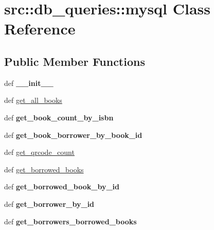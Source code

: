 \hypertarget{classsrc_1_1db__queries_1_1mysql}{
\section{src::db\_\-queries::mysql Class Reference}
\label{classsrc_1_1db__queries_1_1mysql}
}
\subsection*{Public Member Functions}
\begin{DoxyCompactItemize}
\item 
\hypertarget{classsrc_1_1db__queries_1_1mysql_a4583def66e219f8d596357267aec5e39}{
def {\bfseries \_\-\_\-init\_\-\_\-}}
\label{classsrc_1_1db__queries_1_1mysql_a4583def66e219f8d596357267aec5e39}

\item 
def \hyperlink{classsrc_1_1db__queries_1_1mysql_a5194d50e822e8b1c80b332ce7e48bd78}{get\_\-all\_\-books}
\item 
\hypertarget{classsrc_1_1db__queries_1_1mysql_ac335fbdbe5a7c49a023386a9dc916c9a}{
def {\bfseries get\_\-book\_\-count\_\-by\_\-isbn}}
\label{classsrc_1_1db__queries_1_1mysql_ac335fbdbe5a7c49a023386a9dc916c9a}

\item 
\hypertarget{classsrc_1_1db__queries_1_1mysql_a35e2665c109c4fbca5b54bc6a54b6040}{
def {\bfseries get\_\-book\_\-borrower\_\-by\_\-book\_\-id}}
\label{classsrc_1_1db__queries_1_1mysql_a35e2665c109c4fbca5b54bc6a54b6040}

\item 
def \hyperlink{classsrc_1_1db__queries_1_1mysql_a34d06d000fe2d89fca4cc45043b59bca}{get\_\-qrcode\_\-count}
\item 
def \hyperlink{classsrc_1_1db__queries_1_1mysql_ad9654085201259e5d34d86122fb7e970}{get\_\-borrowed\_\-books}
\item 
\hypertarget{classsrc_1_1db__queries_1_1mysql_aa1ee56d7eeb1cd8b7c8625e75de3a3c3}{
def {\bfseries get\_\-borrowed\_\-book\_\-by\_\-id}}
\label{classsrc_1_1db__queries_1_1mysql_aa1ee56d7eeb1cd8b7c8625e75de3a3c3}

\item 
\hypertarget{classsrc_1_1db__queries_1_1mysql_accd81d766fe58d9e9be2775ede90757f}{
def {\bfseries get\_\-borrower\_\-by\_\-id}}
\label{classsrc_1_1db__queries_1_1mysql_accd81d766fe58d9e9be2775ede90757f}

\item 
\hypertarget{classsrc_1_1db__queries_1_1mysql_acddd6fb7c7a49ab08f47e9f6db2d9254}{
def {\bfseries get\_\-borrowers\_\-borrowed\_\-books}}
\label{classsrc_1_1db__queries_1_1mysql_acddd6fb7c7a49ab08f47e9f6db2d9254}


\end{DoxyCompactItemize}
